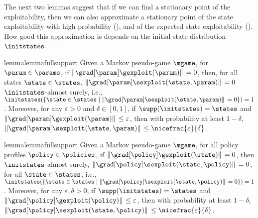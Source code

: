 The next two lemmas suggest that if we can find a stationary point of the exploitability, then we can also approximate a stationary point of the state exploitability with high probability (), and of the expected state exploitability ().
How good this approximation is depends on the initial state distribution $\initstates$.





\begin{restatable}{lemma}{lemmafullsupport}
\label{lem:full_support}
Given a Markov pseudo-game $\mgame$,
for $\param \in \params$, if $\| \grad[\param] \gexploit (\param) \| \, = 0$, then, for all states $\state \in \states$, $\| \grad[\param] \sexploit (\state, \param) \| \, = 0$  $\initstates$-almost surely, i.e., $\initstates (\{ \state \in \states \mid \|\grad[\param] \sexploit (\state, \param) \| \, = 0 \}) = 1$. 
Moreover, for any $\varepsilon > 0$ and $\delta \in [0, 1]$, if $\supp (\initstates) = \states$ and $\| \grad[\param] \gexploit (\param) \| \, \leq \varepsilon$, then with probability at least $1-\delta$, $\| \grad[\param] \sexploit (\state, \param) \| \, \leq \nicefrac{\varepsilon}{\delta}$. 
\end{restatable}

\begin{restatable}{lemma}{lemmafullsupport}
\label{lem:full_support}
Given a Markov pseudo-game $\mgame$,
for all policy profiles $\policy \in \policies$, if $\| \grad[\policy] \gexploit (\state) \| \, = 0$, then $\initstates$-almost surely, $\| \grad[\policy] \sexploit (\state, \policy) \| \, = 0$, for all $\state\in \states$, i.e., $\initstates (\{ \state \in \states \mid \|\grad[\policy] \sexploit (\state, \policy) \| \, = 0 \}) = 1$. 
Moreover, for any $\varepsilon, \delta > 0$, if $\supp (\initstates) = \states$ and $\| \grad[\policy] \gexploit (\policy) \| \, \leq \varepsilon$, then with probability at least $1-\delta$, $\| \grad[\policy] \sexploit (\state, \policy) \| \, \leq \nicefrac{\varepsilon}{\delta}$. 
\end{restatable}


